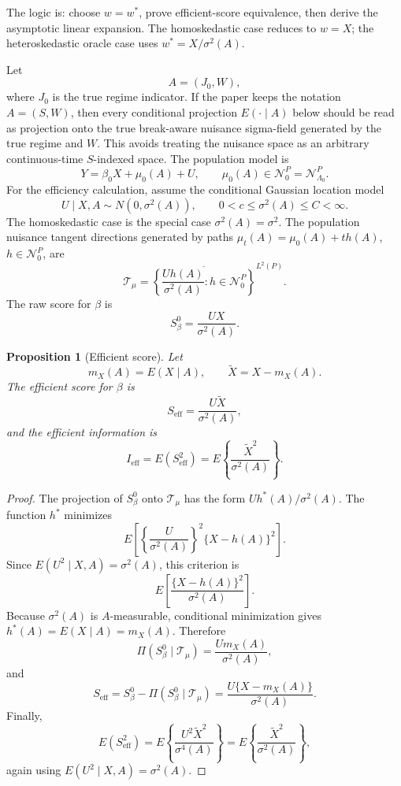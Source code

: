 \documentclass[12pt]{article}
\numberwithin{equation}{section}
\newtheorem{proposition}{Proposition}
\theoremstyle{definition}
\newcommand{\N}{\mathcal N}
\begin{document}
The logic is: choose \(w=w^*\), prove efficient-score equivalence, then derive
the asymptotic linear expansion. The homoskedastic case reduces to \(w=X\); the
heteroskedastic oracle case uses \(w^*=X/\sigma^2(A)\).

Let
\[
    A=(J_0,W),
\]
where \(J_0\) is the true regime indicator. If the paper keeps the notation
\(A=(S,W)\), then every conditional projection \(E(\cdot\mid A)\) below should
be read as projection onto the true break-aware nuisance sigma-field generated
by the true regime and \(W\). This avoids treating the nuisance space as an
arbitrary continuous-time \(S\)-indexed space. The population model is
\[
    Y=\beta_0X+\mu_0(A)+U,
    \qquad
    \mu_0(A)\in\N_0^P=\N_{\Lambda_0}^P.
\]
For the efficiency calculation, assume the conditional Gaussian location model
\[
    U\mid X,A\sim N(0,\sigma^2(A)),
    \qquad
    0<c\le \sigma^2(A)\le C<\infty.
\]
The homoskedastic case is the special case \(\sigma^2(A)=\sigma^2\). The
population nuisance tangent directions generated by paths
\(\mu_t(A)=\mu_0(A)+t h(A)\), \(h\in\N_0^P\), are
\[
    \mathcal T_\mu
    =\overline{\left\{
      \frac{Uh(A)}{\sigma^2(A)}:h\in\N_0^P
     \right\}}^{L^2(P)}.
\]
The raw score for \(\beta\) is
\[
    S_\beta^0=\frac{UX}{\sigma^2(A)}.
\]

\begin{proposition}[Efficient score]
\label{prop:efficient-score}
Let
\[
    m_X(A)=E(X\mid A),
    \qquad
    \widetilde X=X-m_X(A).
\]
The efficient score for \(\beta\) is
\[
    S_{\mathrm{eff}}
    =\frac{U\widetilde X}{\sigma^2(A)},
\]
and the efficient information is
\[
    I_{\mathrm{eff}}
    =E(S_{\mathrm{eff}}^2)
    =E\left\{\frac{\widetilde X^2}{\sigma^2(A)}\right\}.
\]
\end{proposition}

\begin{proof}
The projection of \(S_\beta^0\) onto \(\mathcal T_\mu\) has the form
\(Uh^*(A)/\sigma^2(A)\). The function \(h^*\) minimizes
\[
    E\left[
      \left\{\frac{U}{\sigma^2(A)}\right\}^2
      \{X-h(A)\}^2
    \right].
\]
Since \(E(U^2\mid X,A)=\sigma^2(A)\), this criterion is
\[
    E\left[\frac{\{X-h(A)\}^2}{\sigma^2(A)}\right].
\]
Because \(\sigma^2(A)\) is \(A\)-measurable, conditional minimization gives
\(h^*(A)=E(X\mid A)=m_X(A)\). Therefore
\[
    \Pi(S_\beta^0\mid\mathcal T_\mu)
    =\frac{U m_X(A)}{\sigma^2(A)},
\]
and
\[
    S_{\mathrm{eff}}
    =S_\beta^0-\Pi(S_\beta^0\mid\mathcal T_\mu)
    =\frac{U\{X-m_X(A)\}}{\sigma^2(A)}.
\]
Finally,
\[
    E(S_{\mathrm{eff}}^2)
    =E\left\{\frac{U^2\widetilde X^2}{\sigma^4(A)}\right\}
    =E\left\{\frac{\widetilde X^2}{\sigma^2(A)}\right\},
\]
again using \(E(U^2\mid X,A)=\sigma^2(A)\).
\end{proof}
\end{document}
